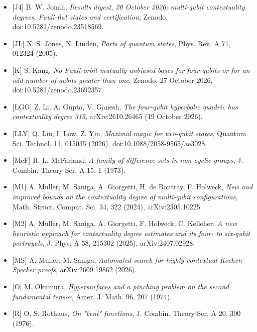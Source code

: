 \documentclass[11pt,a4paper]{article}
\begin{document}
\begin{itemize}
  {[}J3{]} B. W. Jonah, \emph{The reach of the section-square law: hyperplane completions of symplectic and quadric Pauli configurations}, preprint v0.5, manuscript dated 20 October 2026, deposited 21 October 2026. Section 2, Theorems A and B2--B4, Lemma D, Remark 2, Corollary 3, Table 1 and Section 6, Conjecture E. \href{https://zenodo.org/records/23524332}{Primary deposit}, \href{https://doi.org/10.5281/zenodo.23524332}{doi:10.5281/zenodo.23524332}.
\item
  {[}J4{]} B. W. Jonah, \emph{Results digest, 20 October 2026: multi-qubit contextuality degrees, Pauli-flat states and certification}, Zenodo, doi:10.5281/zenodo.23518569.
\item
  {[}JL{]} N. S. Jones, N. Linden, \emph{Parts of quantum states}, Phys. Rev. A 71, 012324 (2005).
\item
  {[}K{]} S. Kang, \emph{No Pauli-orbit mutually unbiased bases for four qubits or for an odd number of qubits greater than one}, Zenodo, 27 October 2026, doi:10.5281/zenodo.23692357.
\item
  {[}LGG{]} Z. Li, A. Gupta, V. Ganesh, \emph{The four-qubit hyperbolic quadric has contextuality degree 315}, arXiv:2610.26465 (19 October 2026).
\item
  {[}LLY{]} Q. Liu, I. Low, Z. Yin, \emph{Maximal magic for two-qubit states}, Quantum Sci. Technol. 11, 015035 (2026), doi:10.1088/2058-9565/ae3028.
\item
  {[}McF{]} R. L. McFarland, \emph{A family of difference sets in non-cyclic groups}, J. Combin. Theory Ser. A 15, 1 (1973).
\item
  {[}M1{]} A. Muller, M. Saniga, A. Giorgetti, H. de Boutray, F. Holweck, \emph{New and improved bounds on the contextuality degree of multi-qubit configurations}, Math. Struct. Comput. Sci. 34, 322 (2024), arXiv:2305.10225.
\item
  {[}M2{]} A. Muller, M. Saniga, A. Giorgetti, F. Holweck, C. Kelleher, \emph{A new heuristic approach for contextuality degree estimates and its four- to six-qubit portrayals}, J. Phys. A 58, 215302 (2025), arXiv:2407.02928.
\item
  {[}MS{]} A. Muller, M. Saniga, \emph{Automated search for highly contextual Kochen--Specker proofs}, arXiv:2609.19862 (2026).
\item
  {[}O{]} M. Okumura, \emph{Hypersurfaces and a pinching problem on the second fundamental tensor}, Amer. J. Math. 96, 207 (1974).
\item
  {[}R{]} O. S. Rothaus, \emph{On "bent" functions}, J. Combin. Theory Ser. A 20, 300 (1976).

\end{itemize}
\end{document}
